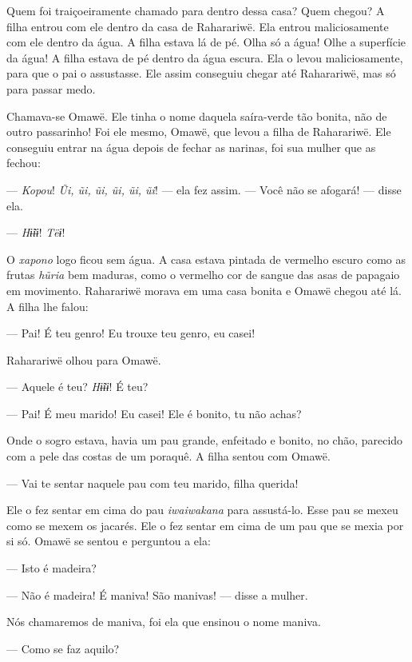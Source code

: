 Quem foi traiçoeiramente chamado para dentro dessa casa? Quem chegou? A
filha entrou com ele dentro da casa de Raharariwë. Ela
entrou maliciosamente com ele dentro da água. A filha estava lá de pé.
Olha só a água! Olhe a superfície da água! A filha estava de pé dentro
da água escura. Ela o levou maliciosamente, para que o pai o assustasse.
Ele assim conseguiu chegar até Raharariwë, mas só para passar medo. 

Chamava-se Omawë. Ele tinha o nome daquela saíra-verde tão bonita, não
de outro passarinho! Foi ele mesmo, Omawë, que levou a filha de
Raharariwë. Ele conseguiu entrar na água depois de fechar as narinas,
foi sua mulher que as fechou:

--- \textit{Kopou}! \textit{Ũi, ũi, ũi, ũi, ũi, ũi}! --- ela fez assim. --- Você não se
afogará! --- disse ela. 

--- \textit{Hɨ̃ɨɨ}! \textit{Tëɨ}! 

O \textit{xapono} logo ficou sem água. A casa estava pintada de vermelho escuro como
as frutas \textit{hũria} bem maduras, como o vermelho cor de sangue das
asas de papagaio em movimento. Raharariwë morava em uma casa bonita e
Omawë chegou até lá. A filha lhe falou:

--- Pai! É teu genro! Eu trouxe teu genro, eu casei! 

Raharariwë olhou para Omawë. 

--- Aquele é teu? \textit{Hɨ̃ɨɨ}! É teu?

--- Pai! É meu marido! Eu casei! Ele é bonito, tu não achas? 


Onde o sogro estava, havia um pau grande, enfeitado e bonito, no chão,
parecido com a pele das costas de um poraquê. A filha sentou com Omawë.

--- Vai te sentar naquele pau com teu marido, filha
querida! 

Ele o fez sentar em cima do pau \textit{iwaiwakana} para assustá-lo. Esse
pau se mexeu como se mexem os jacarés. Ele o fez sentar em cima de um
pau que se mexia por si só. Omawë se sentou e perguntou a ela: 

--- Isto é madeira?

--- Não é madeira! É maniva! São manivas! --- disse a mulher. 

Nós chamaremos de maniva, foi ela que ensinou o nome maniva. 

--- Como se faz aquilo? 

